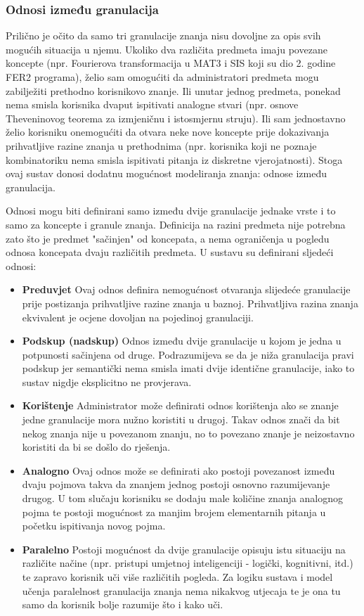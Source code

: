 \documentclass[times, utf8, zavrsni, numeric]{fer}
\begin{document}
\subsubsection{Odnosi između granulacija}
Prilično je očito da samo tri granulacije znanja nisu dovoljne za opis svih mogućih situacija u njemu. Ukoliko dva različita predmeta imaju povezane koncepte (npr. Fourierova transformacija u MAT3 i SIS koji su dio 2. godine FER2 programa), želio sam omogućiti da administratori predmeta mogu zabilježiti prethodno korisnikovo znanje. Ili unutar jednog predmeta, ponekad nema smisla korisnika dvaput ispitivati analogne stvari (npr. osnove Theveninovog teorema za izmjeničnu i istosmjernu struju). Ili sam jednostavno želio korisniku onemogućiti da otvara neke nove koncepte prije dokazivanja prihvatljive razine znanja u prethodnima (npr. korisnika koji ne poznaje kombinatoriku nema smisla ispitivati pitanja iz diskretne vjerojatnosti). Stoga ovaj sustav donosi dodatnu mogućnost modeliranja znanja: odnose između granulacija.
\par
Odnosi mogu biti definirani samo između dvije granulacije jednake vrste i to samo za koncepte i granule znanja. Definicija na razini predmeta nije potrebna zato što je predmet "sačinjen" od koncepata, a nema ograničenja u pogledu odnosa koncepata dvaju različitih predmeta. U sustavu su definirani sljedeći odnosi:

\begin{itemize}
\item \textbf{Preduvjet} Ovaj odnos definira nemogućnost otvaranja slijedeće granulacije prije postizanja prihvatljive razine znanja u baznoj. Prihvatljiva razina znanja ekvivalent je ocjene dovoljan na pojedinoj granulaciji.
\item \textbf{Podskup (nadskup)} Odnos između dvije granulacije u kojom je jedna u potpunosti sačinjena od druge. Podrazumijeva se da je niža granulacija pravi podskup jer semantički nema smisla imati dvije identične granulacije, iako to sustav nigdje eksplicitno ne provjerava.
\item \textbf{Korištenje} Administrator može definirati odnos korištenja ako se znanje jedne granulacije mora nužno koristiti u drugoj. Takav odnos znači da bit nekog znanja nije u povezanom znanju, no to povezano znanje je neizostavno koristiti da bi se došlo do rješenja.
\item \textbf{Analogno} Ovaj odnos može se definirati ako postoji povezanost između dvaju pojmova takva da znanjem jednog postoji osnovno razumijevanje drugog. U tom slučaju korisniku se dodaju male količine znanja analognog pojma te postoji mogućnost za manjim brojem elementarnih pitanja u početku ispitivanja novog pojma.
\item \textbf{Paralelno} Postoji mogućnost da dvije granulacije opisuju istu situaciju na različite načine (npr. pristupi umjetnoj inteligenciji - logički, kognitivni, itd.) te zapravo korisnik uči više različitih pogleda. Za logiku sustava i model učenja paralelnost granulacija znanja nema nikakvog utjecaja te je ona tu samo da korisnik bolje razumije što i kako uči. 
\end{itemize}
\end{document}
